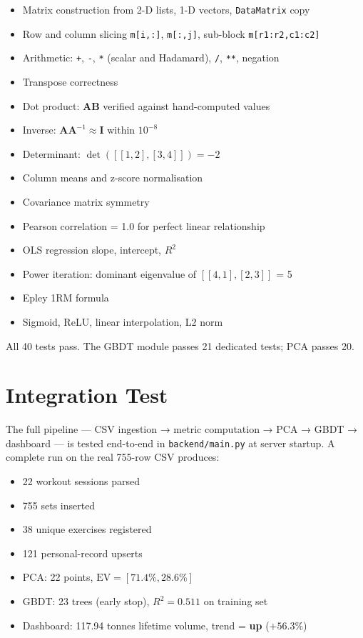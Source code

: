 \documentclass[12pt,a4paper]{report}
\newcommand{\mat}[1]{\mathbf{#1}}
\theoremstyle{definition}
\begin{document}
\begin{itemize}
  \item Matrix construction from 2-D lists, 1-D vectors, \texttt{DataMatrix} copy
  \item Row and column slicing \texttt{m[i,:]}, \texttt{m[:,j]}, sub-block \texttt{m[r1:r2,c1:c2]}
  \item Arithmetic: \texttt{+}, \texttt{-}, \texttt{*} (scalar and Hadamard), \texttt{/}, \texttt{**}, negation
  \item Transpose correctness
  \item Dot product: $\mat{A}\mat{B}$ verified against hand-computed values
  \item Inverse: $\mat{A}\mat{A}^{-1} \approx \mat{I}$ within $10^{-8}$
  \item Determinant: $\det([[1,2],[3,4]]) = -2$
  \item Column means and z-score normalisation
  \item Covariance matrix symmetry
  \item Pearson correlation = 1.0 for perfect linear relationship
  \item OLS regression slope, intercept, $R^2$
  \item Power iteration: dominant eigenvalue of $[[4,1],[2,3]]$ = 5
  \item Epley 1RM formula
  \item Sigmoid, ReLU, linear interpolation, L2 norm
\end{itemize}

All 40 tests pass. The GBDT module passes 21 dedicated tests; PCA passes 20.

\section{Integration Test}

The full pipeline — CSV ingestion → metric computation → PCA → GBDT → dashboard —
is tested end-to-end in \texttt{backend/main.py} at server startup. A complete
run on the real 755-row CSV produces:

\begin{itemize}
  \item 22 workout sessions parsed
  \item 755 sets inserted
  \item 38 unique exercises registered
  \item 121 personal-record upserts
  \item PCA: 22 points, $\text{EV} = [71.4\%, 28.6\%]$
  \item GBDT: 23 trees (early stop), $R^2 = 0.511$ on training set
  \item Dashboard: 117.94 tonnes lifetime volume, trend = \textbf{up} ($+56.3\%$)
\end{itemize}
\end{document}
